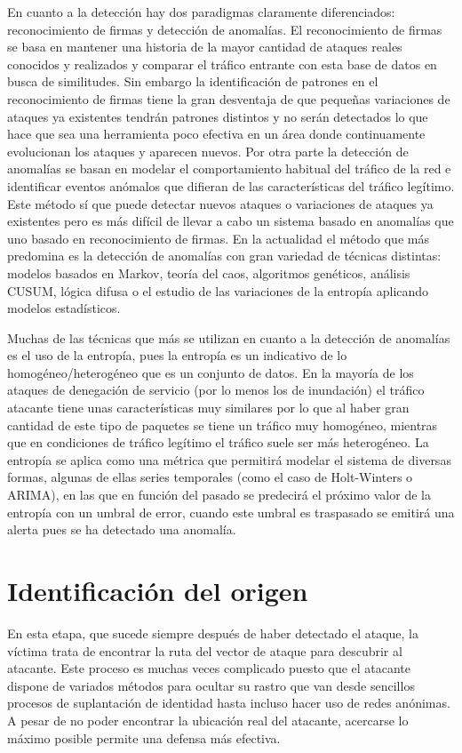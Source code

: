En cuanto a la detección hay dos paradigmas claramente diferenciados: reconocimiento de firmas y detección de anomalías. El reconocimiento de firmas se basa en mantener una historia de la mayor cantidad de ataques reales conocidos y realizados y comparar el tráfico entrante con esta base de datos en busca de similitudes. Sin embargo la identificación de patrones en el reconocimiento de firmas tiene la gran desventaja de que peque\~nas variaciones de ataques ya existentes tendrán patrones distintos y no serán detectados lo que hace que sea una herramienta poco efectiva en un área donde continuamente evolucionan los ataques y aparecen nuevos. Por otra parte la detección de anomalías se basan en modelar el comportamiento habitual del tráfico de la red e identificar eventos anómalos que difieran de las características del tráfico legítimo. Este método sí que puede detectar nuevos ataques o variaciones de ataques ya existentes pero es más difícil de llevar a cabo un sistema basado en anomalías que uno basado en reconocimiento de firmas. En la actualidad el método que más predomina es la detección de anomalías con gran variedad de técnicas distintas: modelos basados en Markov\cite{markov:2013}, teoría del caos\cite{chaos:2013}, algoritmos genéticos\cite{genetic:2012}, análisis CUSUM\cite{wavelets:2012}, lógica difusa\cite{logic:2013} o el estudio de las variaciones de la entropía aplicando modelos estadísticos\cite{entropy1:2015}\cite{entropy2:2015}.

Muchas de las técnicas que más se utilizan en cuanto a la detección de anomalías es el uso de la entropía\cite{shannon-entropy}\cite{renyi-entropy}, pues la entropía es un indicativo de lo homogéneo/heterogéneo que es un conjunto de datos. En la mayoría de los ataques de denegación de servicio (por lo menos los de inundación) el tráfico atacante tiene unas características muy similares por lo que al haber gran cantidad de este tipo de paquetes se tiene un tráfico muy homogéneo, mientras que en condiciones de tráfico legítimo el tráfico suele ser más heterogéneo. La entropía se aplica como una métrica que permitirá modelar el sistema de diversas formas, algunas de ellas series temporales (como el caso de Holt-Winters o ARIMA), en las que en función del pasado se predecirá el próximo valor de la entropía con un umbral de error, cuando este umbral es traspasado se emitirá una alerta pues se ha detectado una anomalía. 

\section{Identificación del origen}
En esta etapa, que sucede siempre después de haber detectado el ataque, la víctima trata de encontrar la ruta del vector de ataque para descubrir al atacante. Este proceso es muchas veces complicado puesto que el atacante dispone de variados métodos para ocultar su rastro que van desde sencillos procesos de suplantación de identidad hasta incluso hacer uso de redes anónimas. A pesar de no poder encontrar la ubicación real del atacante, acercarse lo máximo posible permite una defensa más efectiva\cite{traceback:2014}. \\

